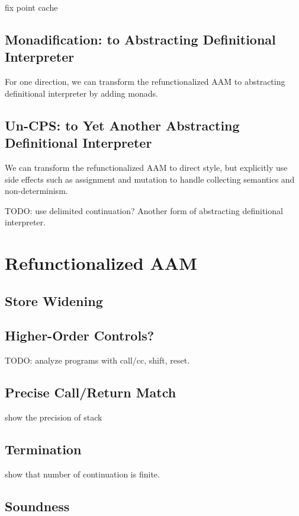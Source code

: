 \documentclass[acmsmall,review,anonymous]{acmart}\settopmatter{printfolios=true,printccs=false,printacmref=false}
\begin{document}
fix point cache

\subsection{Monadification: to Abstracting Definitional Interpreter}

For one direction, we can transform the refunctionalized AAM to abstracting definitional interpreter
by adding monads.

\subsection{Un-CPS: to Yet Another Abstracting Definitional Interpreter}

We can transform the refunctionalized AAM to direct style, but explicitly use 
side effects such as assignment and mutation to handle collecting semantics and non-determinism.

TODO: use delimited continuation? 
Another form of abstracting definitional interpreter.

\section{Refunctionalized AAM}

\subsection{Store Widening}

\subsection{Higher-Order Controls?}

TODO: analyze programs with call/cc, shift, reset.

\subsection{Precise Call/Return Match}

show the precision of stack

\subsection{Termination}

show that number of continuation is finite.

\subsection{Soundness}
\end{document}
